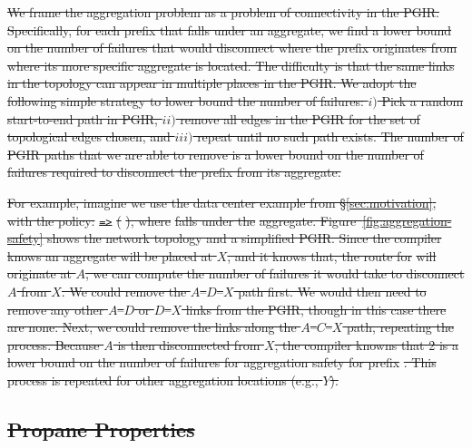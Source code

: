 \documentclass[10pt]{sigalternate052015} %
\newcommand{\sysname}{{\small \sf Propane}\xspace}
\newcommand{\CD}[1]{\texttt{\small #1}}  %
\newcommand{\KW}[1]{\texttt{\small\bfseries{#1}}}
\newcommand{\Path}{\texttt{=>}}
\newcommand{\End}{\KW{end}}
\providecommand{\DIFdel}[1]{{\protect\color{red}\sout{#1}}}                      %
\providecommand{\DIFdelbegin}{} %
\providecommand{\DIFdelend}{} %
\begin{document}
\DIFdel{We frame the aggregation problem as a problem of connectivity in the PGIR. Specifically, for each prefix that falls under an aggregate, we find a lower bound on the number of failures that would disconnect where the prefix originates from where its more specific aggregate is located. The difficulty is that the same links in the topology can appear in multiple places in the PGIR. We adopt the following simple strategy to lower bound the number of failures: $i)$ Pick a random start-to-end path in PGIR, $ii)$ remove all edges in the PGIR for the set of topological edges chosen, and $iii)$ repeat until no such path exists.
The number of PGIR paths that we are able to remove is a lower bound on the number of failures required to disconnect the prefix from its aggregate. 
}%

\DIFdel{For example, imagine we use the data center example from \S\ref{sec:motivation}, with the policy: 
}%
\DIFdel{\Path \text{ }}%
\DIFdel{(}%
\DIFdel{), where }%
\DIFdel{falls under the }%
\DIFdel{aggregate. Figure~\ref{fig:aggregation-safety} shows the network topology and a simplified PGIR. Since the compiler knows an aggregate will be placed at $X$, and it knows that, the route for }%
\DIFdel{will originate at $A$, we can compute the number of failures it would take to disconnect $A$ from $X$. We could remove the $A$--$D$--$X$ path first. We would then need to remove any other $A$--$D$ or $D$--$X$ links from the PGIR, though in this case there are none. Next, we could remove the links along the $A$--$C$--$X$ path, repeating the process. Because $A$ is then disconnected from $X$, the compiler knowns that 2 is a lower bound on the number of failures for aggregation safety for prefix }%
\DIFdel{. This process is repeated for other aggregation locations (e.g., $Y$).
}%

\subsection{\DIFdel{Propane Properties}}
\addtocounter{subsection}{-1}%


\DIFdelend %
\DIFdelbegin %
\end{document}
